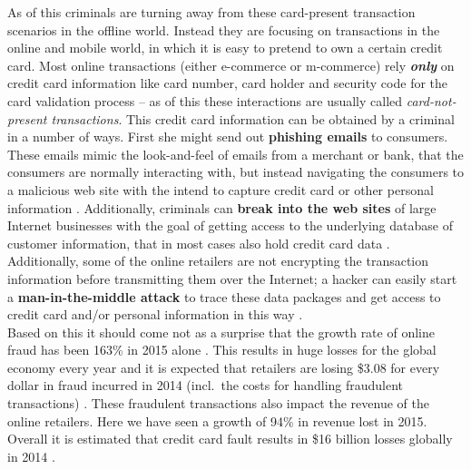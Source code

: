 As of this criminals are turning away from these card-present transaction scenarios in the offline world. Instead they are focusing on transactions
in the online and mobile world, in which it is easy to pretend to own a certain credit card. Most online transactions (either e-commerce or m-commerce)
rely \textbf{\textit{only}} on credit card information like card number, card holder and security code for the card validation process – as of this these interactions
are usually called \textit{card-not-present transactions}. This credit card information can be obtained by a criminal in a number of ways.
First she might send out \textbf{phishing emails} to consumers. These emails mimic the look-and-feel of emails from a merchant or bank, that the consumers are normally
interacting with, but instead navigating the consumers to a malicious web site with the intend to capture credit card or other personal information \citep{ConsumerAction2009}.
Additionally, criminals can \textbf{break into the web sites} of large Internet businesses with the goal of getting access to the underlying database of customer information,
that in most cases also hold credit card data \citep{Holmes2015}. Additionally, some of the online retailers are not encrypting the transaction information before transmitting
them over the Internet; a hacker can easily start a \textbf{man-in-the-middle attack} to trace these data packages and get access to credit card and/or personal information
in this way \citep{Captain2015}. \\

Based on this it should come not as a surprise that the growth rate of online fraud has been 163\% in 2015 alone \citep{PYMNTS2016}.
This results in huge losses for the global economy every year and it is expected that retailers are losing \$3.08 for every dollar in fraud incurred in 2014
(incl.\ the costs for handling fraudulent transactions) \citep{Rampton2015}. These fraudulent transactions also impact the revenue of the online retailers.
Here we have seen a growth of 94\% in revenue lost in 2015. Overall it is estimated that credit card fault results in \$16 billion losses globally in 2014 \citep{PYMNTS2016}
\citep{BusinessWire2015}. \\

